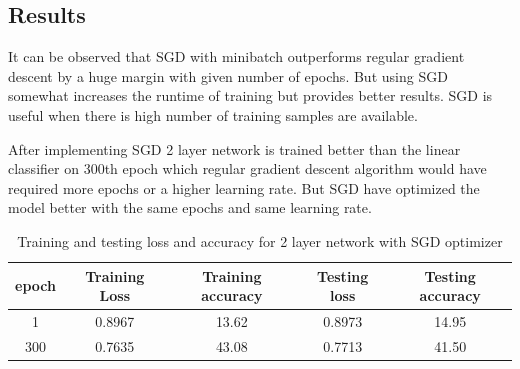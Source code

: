 \documentclass[a4paper, 12pt]{article}
\begin{document}
		\subsection{Results}
		It can be observed that SGD with minibatch outperforms regular gradient descent by a huge margin with given number of epochs. But using SGD somewhat increases the runtime of training but provides better results. SGD is useful when there is high number of training samples are available. 
		\par
		After implementing SGD 2 layer network is trained better than the linear classifier on 300th epoch which regular gradient descent algorithm would have required more epochs or a higher learning rate. But SGD have optimized the model better with the same epochs and same learning rate.
		\begin{table}
			\centering
			\begin{tabular}{|c|c|c|c|c|}
				\hline
				epoch & Training Loss & Training accuracy & Testing loss & Testing accuracy\\
				\hline
				1 & 0.8967 & 13.62 & 0.8973 & 14.95 \\
				300 & 0.7635 & 43.08 & 0.7713 & 41.50\\
				\hline
			\end{tabular}
			\caption{Training and testing loss and accuracy for 2 layer network with SGD optimizer}
			\label{sgd}
		\end{table}
\end{document}
